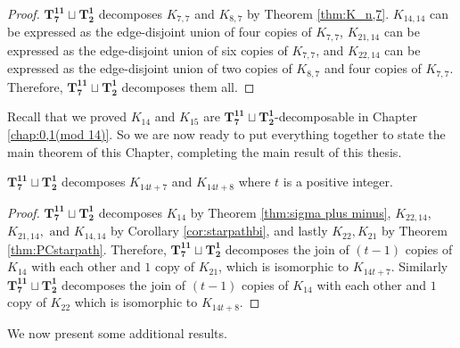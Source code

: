 \begin{proof}
    $\mathbf{T_{7}^{11}}\sqcup\mathbf{T_{2}^{1}}$ decomposes $K_{7,7}$ and $K_{8,7}$ by Theorem \ref{thm:K_n,7}. $K_{14,14}$ can be expressed as the edge-disjoint union of four copies of $K_{7,7}$, $K_{21,14}$ can be expressed as the edge-disjoint union of six copies of $K_{7,7}$, and $K_{22,14}$ can be expressed as the edge-disjoint union of two copies of $K_{8,7}$ and four copies of $K_{7,7}$. Therefore, $\mathbf{T_{7}^{11}}\sqcup\mathbf{T_{2}^{1}}$ decomposes them all.

\end{proof}
Recall that we proved $K_{14}$ and $K_{15}$ are $\mathbf{T_{7}^{11}}\sqcup\mathbf{T_{2}^{1}}$-decomposable in Chapter \ref{chap:0,1(mod 14)}. So we are now ready to put everything together to state the main theorem of this Chapter, completing the main result of this thesis.
\begin{thm}
$\mathbf{T_{7}^{11}}\sqcup\mathbf{T_{2}^{1}}$ decomposes $K_{14t+7}$ and $K_{14t+8}$ where $t$ is a positive integer. 
\end{thm}
\begin{proof}
$\mathbf{T_{7}^{11}}\sqcup\mathbf{T_{2}^{1}}$ decomposes $K_{14}$ by Theorem \ref{thm:sigma plus minus}, $K_{22,14}$, $K_{21,14},\text{ and }K_{14,14}$ by Corollary \ref{cor:starpathbi}, and lastly $K_{22},K_{21}$ by Theorem \ref{thm:PCstarpath}.
\newline\newline
Therefore, $\mathbf{T_{7}^{11}}\sqcup\mathbf{T_{2}^{1}}$ decomposes the join of $(t-1)$ copies of $K_{14}$ with each other and $1$ copy of $K_{21}$, which is isomorphic to $K_{14t+7}$. Similarly $\mathbf{T_{7}^{11}}\sqcup\mathbf{T_{2}^{1}}$ decomposes the join of $(t-1)$ copies of $K_{14}$ with each other and $1$ copy of $K_{22}$ which is isomorphic to $K_{14t+8}$.

\end{proof}

We now present some additional results. 